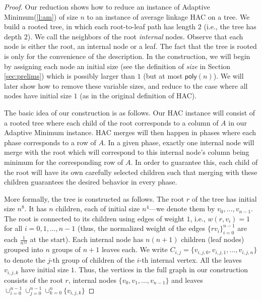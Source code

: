 \documentclass[11pt]{article}
\newcommand{\am}{\textsf{Adaptive Minimum}\xspace}
\newcommand{\poly}{\ensuremath{\mathsf{poly}}}
\begin{document}
\begin{proof}
Our reduction shows how to reduce an instance of \am (\cref{l:am}) of size $n$ to an instance of average linkage HAC on a tree.
We build a rooted tree, in which each root-to-leaf path has length $2$ (i.e., the tree has depth $2$). %
We call the neighbors of the root \emph{internal} nodes.
Observe that each node is either the root, an internal node or a leaf.
The fact that the tree is rooted is only for the convenience of the description.
In the construction, we will begin by assigning each node an initial size (see the definition of \textit{size} in Section \ref{sec:prelims}) which is possibly larger than $1$ (but at most $\poly(n)$). We will later show how to remove these variable sizes, and reduce to the case where all nodes have initial size $1$ (as in the original definition of HAC).

The basic idea of our construction is as follows. Our HAC instance will consist of a rooted tree where each child of the root corresponds to a column of $A$ in our \am instance. HAC merges will then happen in phases where each phase corresponds to a row of $A$. In a given phase, exactly one internal node will merge with the root which will correspond to this internal node's column being minimum for the corresponding row of $A$. In order to guarantee this, each child of the root will have its own carefully selected children such that merging with these children guarantees the desired behavior in every phase. 

More formally, the tree is constructed as follows.
The root $r$ of the tree has initial size $n^8$.
It has $n$ children, each of initial size $n^4$---we denote them by $v_0, \ldots, v_{n-1}$.
The root is connected to its children using edges of weight $1$, i.e., $w(r,v_i) = 1$ for all $i=0,1,\dots,n-1$ (thus, the normalized weight of the edges $\{rv_i\}_{i=0}^{n-1}$ are each $\frac{1}{n^{12}}$ at the start).
Each internal node has $n(n+1)$ children (leaf nodes) grouped into $n$ groups of $n+1$ leaves each.  We write $C_{i,j} = \{v_{i,j,0}, v_{i,j,1}, \dots, v_{i,j,n}\}$ to denote the $j$-th group of children of the $i$-th internal vertex. 
All the leaves $v_{i,j,k}$ have initial size $1$. Thus, the vertices in the full graph in our construction consists of the root $r$, internal nodes $\{v_0,v_1,\dots,v_{n-1}\}$ and leaves $\cup_{i=0}^{n-1} \cup_{j=0}^{n-1} \cup_{k=0}^n \{v_{i,j,k}\}$


\end{proof}
\end{document}
